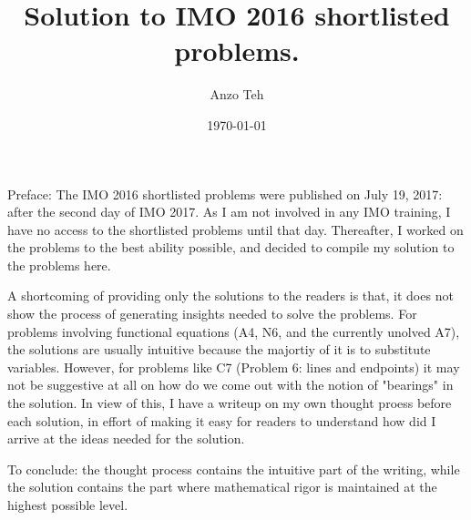 \documentclass[11pt,a4paper]{article}
\begin{document}
\newcommand{\la}{\leftarrow}
\newcommand{\lra}{\leftrightarrow}


\title{Solution to IMO 2016 shortlisted problems.}
\author{Anzo Teh}
\date{\today}
\maketitle

Preface: 
The IMO 2016 shortlisted problems were published on July 19, 2017: after the second day of IMO 2017. As I am not involved in any IMO training, I have no access to the shortlisted problems until that day. Thereafter, I worked on the problems to the best ability possible, and decided to compile my solution to the problems here. 

A shortcoming of providing only the solutions to the readers is that, it does not show the process of generating insights needed to solve the problems. 
For problems involving functional equations (A4, N6, and the currently unolved A7), the solutions are usually intuitive because the majortiy of it is to substitute variables. 
However, for problems like C7 (Problem 6: lines and endpoints) it may not be suggestive at all on how do we come out with the notion of "bearings" in the solution. 
In view of this, I have a writeup on my own thought proess before each solution, in effort of making it easy for readers to understand how did I arrive at the ideas needed for the solution. 

To conclude: the thought process contains the intuitive part of the writing, while the solution contains the part where mathematical rigor is maintained at the highest possible level. 

\newpage
\end{document}
